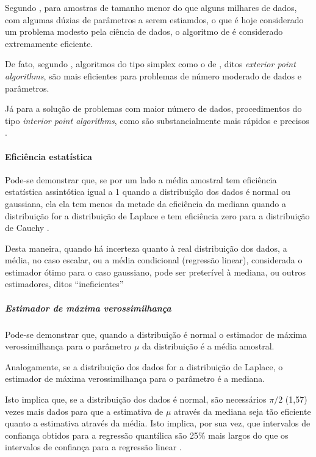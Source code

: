 \documentclass[a4paper, 12pt]{article}
\let\oldparagraph\paragraph
\renewcommand{\paragraph}[1]{\oldparagraph{#1}\mbox{}}
\let\oldsubparagraph\subparagraph
\renewcommand{\subparagraph}[1]{\oldsubparagraph{#1}\mbox{}}
\begin{document}
Segundo \textcite[p.~3]{conopt}, para amostras de tamanho menor do que
alguns milhares de dados, com algumas dúzias de parâmetros a serem
estiamdos, o que é hoje considerado um problema modesto pela ciência de
dados, o algoritmo de \textcite{barrodale} é considerado extremamente
eficiente.

De fato, segundo \textcite[p.~6]{conopt}, algoritmos do tipo simplex
como o de \textcite{barrolade}, ditos \emph{exterior point algorithms},
são mais eficientes para problemas de número moderado de dados e
parâmetros.

Já para a solução de problemas com maior número de dados, procedimentos
do tipo \emph{interior point algorithms}, como são substancialmente mais
rápidos e precisos \autocite[6]{conopt}.

\hypertarget{eficiencia-estatistica}{%
\paragraph{Eficiência estatística}\label{eficiencia-estatistica}}

Pode-se demonstrar que, se por um lado a média amostral tem eficiência
estatística assintótica igual a 1 quando a distribuição dos dados é
normal ou gaussiana, ela ela tem menos da metade da eficiência da
mediana quando a distribuição for a distribuição de Laplace e tem
eficiência zero para a distribuição de Cauchy
\autocite[p.36]{koenker1978}.

Desta maneira, quando há incerteza quanto à real distribuição dos dados,
a média, no caso escalar, ou a média condicional (regressão linear),
considerada o estimador ótimo para o caso gaussiano, pode ser preterível
à mediana, ou outros estimadores, ditos ``ineficientes''
\autocite[p.36]{koenker1978}

\hypertarget{estimador-de-maxima-verossimilhanca}{%
\subparagraph{Estimador de máxima
verossimilhança}\label{estimador-de-maxima-verossimilhanca}}

Pode-se demonstrar que, quando a distribuição é normal o estimador de
máxima verossimilhança para o parâmetro \(\mu\) da distribuição é a
média amostral.

Analogamente, se a distribuição dos dados for a distribuição de Laplace,
o estimador de máxima verossimilhança para o parâmetro é a mediana.

Isto implica que, se a distribuição dos dados é normal, são necessários
\(\pi/2\) (1,57) vezes mais dados para que a estimativa de \(\mu\)
através da mediana seja tão eficiente quanto a estimativa através da
média. Isto implica, por sua vez, que intervalos de confiança obtidos
para a regressão quantílica são 25\% mais largos do que os intervalos de
confiança para a regressão linear
\autocites[354]{koenker2000}[92]{dasGupta}.
\end{document}

